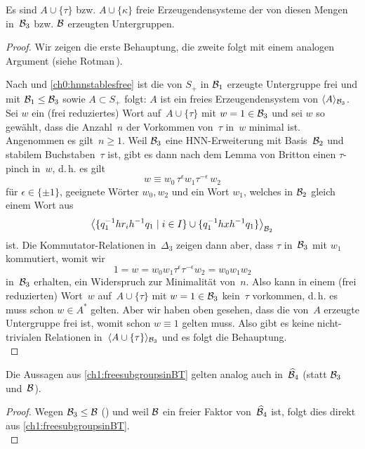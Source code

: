 \begin{thLemma}\label{ch1:freesubgroupsinBT}
    Es sind $A\cup\{\tau\}$ bzw. $A\cup\{\kappa\}$ freie
    Erzeugendensysteme der von diesen Mengen in~$\BT_3$ bzw.
    $\BT$ erzeugten Untergruppen.
\end{thLemma}
%
\begin{proof}
    Wir zeigen die erste Behauptung, die zweite folgt mit einem
    analogen Argument (siehe Rotman\,\cite[Lemma~12.21]{bookc:rotman95}).
    
    Nach  und \cref{ch0:hnnstablesfree}
    ist die von $S_+$ in $\BT_1$ erzeugte Untergruppe frei
    und mit $\BT_1 \leq \BT_3$ sowie $A\subset S_+$ folgt:
    $A$ ist ein freies Erzeugendensystem von $\Spann{A}_{\BT_3}$.
    Sei $w$ ein (frei reduziertes) Wort auf~$A\cup\{\tau\}$
    mit $w=1\in\BT_3$ und sei $w$ so gewählt, dass die Anzahl~$n$
    der Vorkommen von~$\tau$ in~$w$ minimal ist. Angenommen es gilt~$n\geq1$.
    Weil $\BT_3$ eine HNN-Erweiterung mit Basis~$\BT_2$ und stabilem
    Buchstaben~$\tau$ ist, gibt es dann nach dem Lemma von Britton
     einen $\tau$-pinch in~$w$, d.\,h. es gilt
    \[ w \equiv w_0 \, \tau^\epsilon w_1 \tau^{-\epsilon} \, w_2 \]
    für $\epsilon\in\{\pm1\}$, geeignete Wörter $w_0,w_2$ und
    ein Wort $w_1$, welches in $\BT_2$ gleich einem Wort aus
    \[ \Spann[\big]{
            \{q_1\inv hr_ih\inv q_1 \nMid i\in I\}
            \cup\{q_1\inv hxh\inv q_1\}
        }_{\BT_2}
    \]
    ist. Die Kommutator-Relationen in~$\Delta_3$ zeigen dann aber, dass
    $\tau$ in~$\BT_3$ mit $w_1$ kommutiert, womit wir
    \[ 1 = w = w_0 w_1 \tau^\epsilon \tau^{-\epsilon} w_2 = w_0w_1w_2
    \]
    in~$\BT_3$ erhalten, ein Widerspruch zur Minimalität von~$n$.
    Also kann in einem (frei reduzierten) Wort~$w$ auf~$A\cup\{\tau\}$
    mit $w=1\in\BT_3$ kein~$\tau$ vorkommen, d.\,h. es muss schon
    $w\in A^*$ gelten. Aber wir haben oben gesehen, dass die von~$A$
    erzeugte Untergruppe frei ist, womit schon $w\equiv1$ gelten muss.
    Also gibt es keine nicht-trivialen Relationen
    in~$\Spann{A\cup\{\tau\}}_{\BT_3}$ und es folgt die Behauptung.
    \\
\end{proof}

\begin{thKorollar}\label{ch1:freesubgroupsinhBT4}
    Die Aussagen aus \cref{ch1:freesubgroupsinBT} gelten analog auch
    in~$\hBT_4$ (statt $\BT_3$ und~$\BT$).
\end{thKorollar}
%
\begin{proof}
    Wegen $\BT_3\leq\BT$ () und
    weil $\BT$ ein freier Faktor von~$\hBT_4$ ist, folgt dies
    direkt aus \cref{ch1:freesubgroupsinBT}.
    \\
\end{proof}

